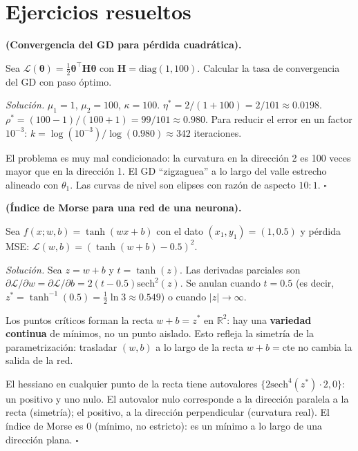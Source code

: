 \section*{Ejercicios resueltos}

\begin{ejercicio}
\label{ej:conv_cuad_resuelto}
\textbf{(Convergencia del GD para pérdida cuadrática).}

Sea $\mathcal{L}(\bm{\theta}) = \frac{1}{2}\bm{\theta}^\top\bm{H}
\bm{\theta}$ con $\bm{H} = \text{diag}(1, 100)$. Calcular la tasa de
convergencia del GD con paso óptimo.

\medskip\noindent\textit{Solución.}
$\mu_1 = 1$, $\mu_2 = 100$, $\kappa = 100$.
$\eta^* = 2/(1+100) = 2/101 \approx 0.0198$.
$\rho^* = (100-1)/(100+1) = 99/101 \approx 0.980$.
Para reducir el error en un factor $10^{-3}$:
$k = \log(10^{-3})/\log(0.980) \approx 342$ iteraciones.

El problema es muy mal condicionado: la curvatura en la dirección 2 es
100 veces mayor que en la dirección 1. El GD ``zigzaguea'' a lo largo
del valle estrecho alineado con $\theta_1$. Las curvas de nivel son
elipses con razón de aspecto $10:1$. $\square$
\end{ejercicio}

\begin{ejercicio}
\label{ej:morse_neurona}
\textbf{(Índice de Morse para una red de una neurona).}

Sea $f(x;w,b) = \tanh(wx+b)$ con el dato $(x_1,y_1) = (1,0.5)$ y
pérdida MSE: $\mathcal{L}(w,b) = (\tanh(w+b)-0.5)^2$.

\medskip\noindent\textit{Solución.}
Sea $z = w+b$ y $t = \tanh(z)$. Las derivadas parciales son
$\partial\mathcal{L}/\partial w = \partial\mathcal{L}/\partial b =
2(t-0.5)\text{sech}^2(z)$. Se anulan cuando $t = 0.5$ (es decir,
$z^* = \tanh^{-1}(0.5) = \frac{1}{2}\ln 3 \approx 0.549$) o cuando
$|z| \to \infty$.

Los puntos críticos forman la recta $w + b = z^*$ en $\mathbb{R}^2$:
hay una \textbf{variedad continua} de mínimos, no un punto aislado.
Esto refleja la simetría de la parametrización: trasladar $(w,b)$ a lo
largo de la recta $w+b = \text{cte}$ no cambia la salida de la red.

El hessiano en cualquier punto de la recta tiene autovalores
$\{2\text{sech}^4(z^*)\cdot 2, 0\}$: un positivo y uno nulo. El
autovalor nulo corresponde a la dirección paralela a la recta
(simetría); el positivo, a la dirección perpendicular (curvatura real).
El índice de Morse es 0 (mínimo, no estricto): es un mínimo a lo largo
de una dirección plana. $\square$
\end{ejercicio}

